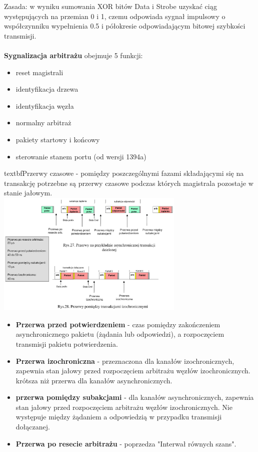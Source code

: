 Zasada: w wyniku sumowania XOR bitów Data i Strobe uzyskać ciąg występujących na przemian 0 i 1, czemu odpowiada sygnał impulsowy o współczynniku wypełnienia 0.5 i półokresie odpowiadającym bitowej szybkości transmisji.\\\\
\textbf{Sygnalizacja arbitrażu} obejmuje 5 funkcji:
\begin{itemize}
	\item reset magistrali
	\item identyfikacja drzewa
	\item identyfikacja węzła
	\item normalny arbitraż
	\item pakiety startowy i końcowy
	\item sterowanie stanem portu (od wersji 1394a)
\end{itemize}
textbf{Przerwy czasowe} - pomiędzy poszczególnymi fazami składającymi się na transakcję potrzebne są przerwy czasowe podczas których magistrala pozostaje w stanie jałowym.\\
\includegraphics[width=9cm]{./wyklady/FIREWIRE_29_1.pdf}\\
\begin{itemize}
	\item \textbf{Przerwa przed potwierdzeniem} - czas pomiędzy zakończeniem asynchronicznego pakietu (żądania lub odpowiedzi), a rozpoczęciem transmisji pakietu potwierdzenia.
	\item \textbf{Przerwa izochroniczna} - przeznaczona dla kanałów izochronicznych, zapewnia stan jałowy przed rozpoczęciem arbitrażu węzłów izochronicznych. krótsza niż przerwa dla kanałów asynchronicznych.
	\item \textbf{przerwa pomiędzy subakcjami} - dla kanałów asynchronicznych, zapewnia stan jałowy przed rozpoczęciem arbitrażu węzłów izochronicznych. Nie występuje między żądaniem a odpowiedzią w przypadku transmisji dołączanej.
	\item \textbf{Przerwa po resecie arbitrażu} - poprzedza "Interwał równych szans".
\end{itemize}

